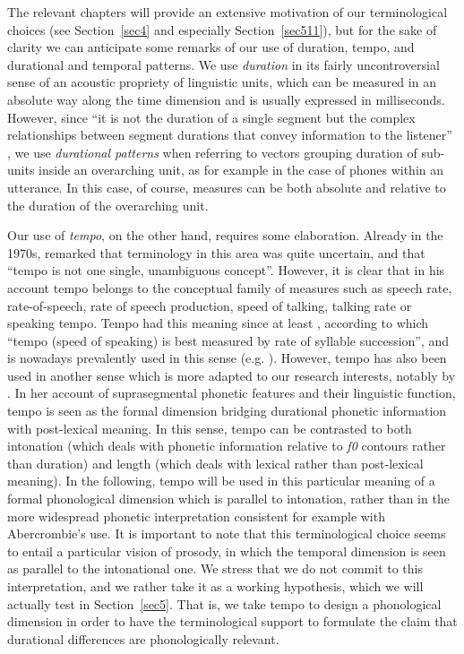 The relevant chapters will provide an extensive motivation of our terminological choices (see Section~\ref{sec4} and especially Section~\ref{sec511}), but for the sake of clarity we can anticipate some remarks of our use of duration, tempo, and durational and temporal patterns. We use \textit{duration} in its fairly uncontroversial sense of an acoustic propriety of linguistic units, which can be measured in an absolute way along the time dimension and is usually expressed in milliseconds. However, since ``it is not the duration of a single segment but the complex relationships between segment durations that convey information to the listener'' \citep{lyberg1981observations}, we use \textit{durational patterns} when referring to vectors grouping duration of sub-units inside an overarching unit, as for example in the case of phones within an utterance. In this case, of course, measures can be both absolute and relative to the duration of the overarching unit.

Our use of \textit{tempo}, on the other hand, requires some elaboration. Already in the 1970s, \citet{wood1973speech} remarked that terminology in this area was quite uncertain, and that ``tempo is not one single, unambiguous concept''. However, it is clear that in his account tempo belongs to the conceptual family of measures such as speech rate, rate-of-speech, rate of speech production, speed of talking, talking rate or speaking tempo. Tempo had this meaning since at least \citet{abercrombie1967elements}, according to which ``tempo (speed of speaking) is best measured by rate of syllable succession'', and is nowadays prevalently used in this sense (e.g. \citealt{trouvain2004tempo}). However, tempo has also been used in another sense which is more adapted to our research interests, notably by \citet{lehiste1970suprasegmentals}. In her account of suprasegmental phonetic features and their linguistic function, tempo is seen as the formal dimension bridging durational phonetic information with post-lexical meaning. In this sense, tempo can be contrasted to both intonation (which deals with phonetic information relative to \textit{f0} contours rather than duration) and length (which deals with lexical rather than post-lexical meaning). In the following, tempo will be used in this particular meaning of a formal phonological dimension which is parallel to intonation, rather than in the more widespread phonetic interpretation consistent for example with Abercrombie's use. It is important to note that this terminological choice seems to entail a particular vision of prosody, in which the temporal dimension is seen as parallel to the intonational one. We stress that we do not commit to this interpretation, and we rather take it as a working hypothesis, which we will actually test in Section~\ref{sec5}. That is, we take tempo to design a phonological dimension in order to have the terminological support to formulate the claim that durational differences are phonologically relevant.

